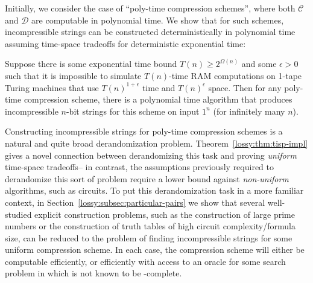 Initially, we consider the case of ``poly-time compression schemes'', where both $\mathcal{C}$ and $\mathcal{D}$ are computable in polynomial time. We show that for such schemes, incompressible strings can be constructed deterministically in polynomial time assuming time-space tradeoffs for deterministic exponential time:
\begin{theorem*}
Suppose there is some exponential time bound $T(n) \geq 2^{\Omega(n)}$ and some $\epsilon > 0$ such that it is impossible to simulate $T(n)$-time RAM computations on 1-tape Turing machines that use $T(n)^{1+\epsilon}$ time and $T(n)^{\epsilon}$ space. Then for any poly-time compression scheme, there is a polynomial time algorithm that produces incompressible $n$-bit strings for this scheme on input $1^n$ (for infinitely many $n$).
\end{theorem*}


Constructing incompressible strings for poly-time compression schemes is a natural and quite broad derandomization problem. Theorem~\ref{lossy:thm:tisp-impl} gives a novel connection between derandomizing this task and proving \emph{uniform} time-space tradeoffs-- in contrast, the assumptions previously required to derandomize this sort of problem require a lower bound against \emph{non-uniform} algorithms, such as circuits. To put this derandomization task in a more familiar context, in Section~\ref{lossy:subsec:particular-pairs} we show that several well-studied explicit construction problems, such as the construction of large prime numbers or the construction of truth tables of high circuit complexity/formula size, can be reduced to the problem of finding incompressible strings for some uniform compression scheme. In each case, the compression scheme will either be computable efficiently, or efficiently with access to an oracle for some search problem in  which is not known to be -complete. 

